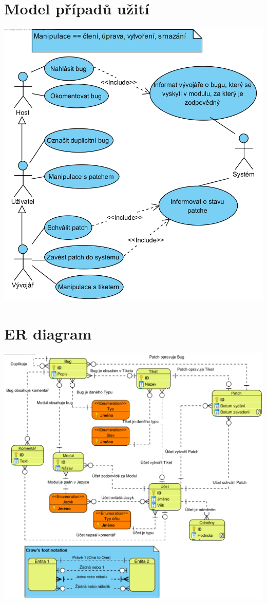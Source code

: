 \documentclass[a4paper, titlepage, final, 12pt]{article}
\begin{document}
\section{Model případů užití}
	\includegraphics[width=\textwidth,height=\textheight,keepaspectratio]{Use-Case.png}

\section{ER diagram}
	\hspace{-1.5cm}
	\includegraphics[keepaspectratio]{ER2.png}
\end{document}
